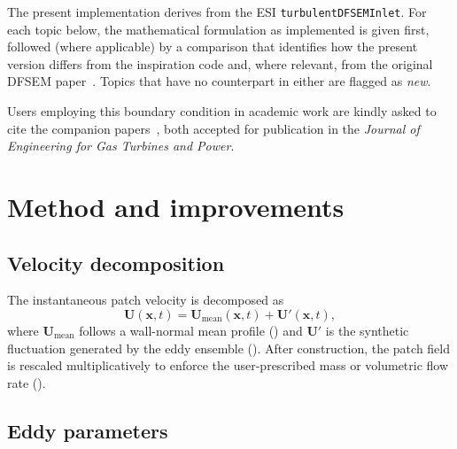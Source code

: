 \documentclass[
 amsmath,amssymb,
 aps,
 twocolumn,
]{revtex4-2}
\renewcommand{\vec}[1]{\boldsymbol{#1}}
\begin{document}
The present implementation derives from the ESI
\texttt{turbulentDFSEMInlet}. For each topic below, the mathematical
formulation as implemented is given first, followed (where applicable) by
a comparison that identifies how the present version differs from the
inspiration code and, where relevant, from the original DFSEM
paper~\cite{PCR2013}. Topics that have no counterpart in either are
flagged as \emph{new}.

Users employing this boundary condition in academic work are kindly
asked to cite the companion papers~\cite{Fyhn2026Ammonia,
Fyhn2026FlameSheet}, both accepted for publication in the \emph{Journal
of Engineering for Gas Turbines and Power}.

\section{Method and improvements}\label{sec:method}

\subsection{Velocity decomposition}

The instantaneous patch velocity is decomposed as
\begin{equation}\label{eq:decomp}
  \vec U(\vec x,t)
  = \vec U_{\mathrm{mean}}(\vec x,t) + \vec U'(\vec x,t),
\end{equation}
where $\vec U_{\mathrm{mean}}$ follows a wall-normal mean profile
() and $\vec U'$ is the synthetic fluctuation generated by
the eddy ensemble (). After construction, the patch
field is rescaled multiplicatively to enforce the user-prescribed mass or
volumetric flow rate ().

\subsection{Eddy parameters}
\end{document}
